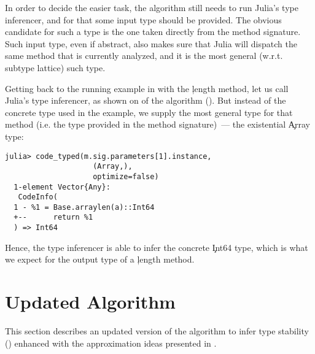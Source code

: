
In order to decide the easier task, the algorithm still needs to run Julia's
type inferencer, and for that some input type should be provided. The obvious
candidate for such a type is the one taken directly from the method signature.
Such input type, even if abstract, also makes sure that Julia will dispatch the
same method that is currently analyzed, and it is the most general (w.r.t.
subtype lattice) such type.

Getting back to the running example in  with the
\c{length} method, let us call Julia's type inferencer, as
shown on  of the algorithm (). But
instead of the concrete type used in the example, we supply the most general type
for that method (i.e. the type provided in the method signature)~--- the
existential \c{Array} type:
\begin{lstlisting}[style=jterm]
  julia> code_typed(m.sig.parameters[1].instance,
                    (Array,),
                    optimize=false)
  1-element Vector{Any}:
   CodeInfo(
  1 - %1 = Base.arraylen(a)::Int64
  +--      return %1
  ) => Int64
\end{lstlisting}
Hence, the type inferencer is able to infer the concrete \c{Int64} type, which
is what we expect for the output type of a \c{length} method.

\section{Updated Algorithm} %
\label{sec:approx:algo-final}

This section describes an updated version of the algorithm to infer type
stability () enhanced with the approximation ideas
presented in .


